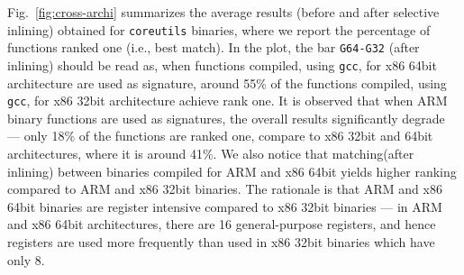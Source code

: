 Fig.~\ref{fig:cross-archi} summarizes the average results (before and after selective inlining) obtained for \texttt{coreutils} binaries, where we report the percentage of functions ranked one (i.e., best match).
In the plot,  the bar \texttt{G64-G32} (after inlining) should be read as, when functions compiled, using \texttt{gcc}, for x86 64bit architecture are used as signature, around 55\% of the functions compiled, using \texttt{gcc}, for x86 32bit architecture achieve rank one. It is observed that when ARM binary functions are used as signatures, the overall results significantly degrade --- only 18\% of the functions are ranked one, compare to x86 32bit and 64bit architectures, where it is around 41\%.
We also notice that matching(after inlining) between binaries compiled for ARM and x86 64bit  yields higher ranking compared to ARM and x86 32bit binaries. The rationale is that ARM and x86 64bit binaries are register intensive compared to x86 32bit binaries ---  in ARM and x86 64bit architectures, there are 16 general-purpose registers, and hence registers are used more frequently than used in x86 32bit binaries which have only 8.

